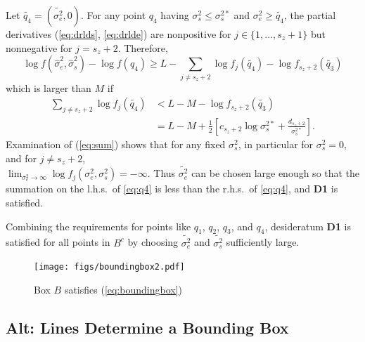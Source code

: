 \documentclass{report}
\newcommand{\RL}{f}
\newcommand{\logRL}{\log\RL}
\newcommand{\sigssq}{\sigma_s^2}
\newcommand{\sigesq}{\sigma_e^2}
\newcommand{\sshat}{\hat\sigma^2_e,\hat\sigma^2_s}
\begin{document}
Let $\widetilde{q_4} = (\widetilde{\sigma_e^2},0)$.  For any point $q_4$ having $\sigssq \le \sigma_s^{2*}$ and $\sigesq \ge \widetilde{q_4}$, the partial derivatives (\ref{eq:drlds}, \ref{eq:drlde}) are nonpositive for $j \in \{1, \dots, s_z+1\}$  but nonnegative for $j=s_z+2$.  Therefore,
\begin{equation*}
	\logRL(\sshat) - \logRL(q_4) \ge L - \sum_{j \ne s_z+2} \logRL_j(\widetilde{q_4}) - \logRL_{s_z+2}(\widetilde{q_3})
\end{equation*}
which is larger than $M$ if
\begin{equation}
\label{eq:q4}
  \begin{split}
    \sum_{j \ne s_z+2} \logRL_j(\widetilde{q_4})
      &< L - M - \logRL_{s_z+2}(\widetilde{q_3})\\
      &= L - M + \frac{1}{2} \left[ c_{s_z+2}\log\sigma_s^{2*} + \frac{d_{s_z+2}}{\sigma_s^{2*}}\right].
  \end{split}
\end{equation}
Examination of (\ref{eq:sum}) shows that for any fixed $\sigssq$, in particular for $\sigssq=0$, and for $j \ne s_z+2$,\\ $\lim_{\sigesq \rightarrow \infty} \logRL_j(\sigesq,\sigssq) = -\infty$.  Thus $\widetilde{\sigma_e^2}$ can be chosen large enough so that the summation on the l.h.s.~of \eqref{eq:q4} is less than the r.h.s.~of \eqref{eq:q4}, and  \textbf{D1} is satisfied.

Combining the requirements for points like $q_1$, $q_2$, $q_3$, and $q_4$, desideratum \textbf{D1} is satisfied for all points in $B^c$ by choosing $\widetilde{\sigma_e^2}$ and $\widetilde{\sigma_s^2}$ sufficiently large. 

\begin{figure}[h]
	\centering
	\texttt{[image: figs/boundingbox2.pdf]}
	\caption{Box $B$ satisfies (\ref{eq:boundingbox})}
	\label{fig:boundingbox2}
\end{figure}


\subsection*{Alt: Lines Determine a Bounding Box}
\end{document}
